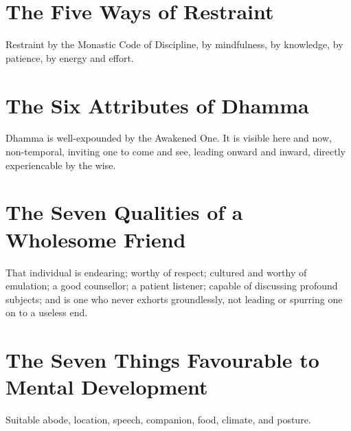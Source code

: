 
\section*{The Five Ways of Restraint}

Restraint by the Monastic Code of Discipline, by mindfulness, by knowledge, by
patience, by energy and effort.\\
\mbox{}

\vspace*{-\baselineskip}

\section*{The Six Attributes of Dhamma}

Dhamma is well-expounded by the Awakened One. It is visible here and now,
non-temporal, inviting one to come and see, leading onward and inward, directly
experiencable by the wise.\\
\mbox{}

\vspace*{-\baselineskip}

\section*{The Seven Qualities of a Wholesome Friend}


That individual is endearing; worthy of respect; cultured and worthy of
emulation; a good counsellor; a patient listener; capable of discussing profound
subjects; and is one who never exhorts groundlessly, not leading or spurring one
on to a useless end.\\
\mbox{}

\vspace*{-\baselineskip}

\section*{The Seven Things Favourable to Mental Development}


Suitable abode, location, speech, companion, food, climate, and posture.\\
\mbox{}

\clearpage

